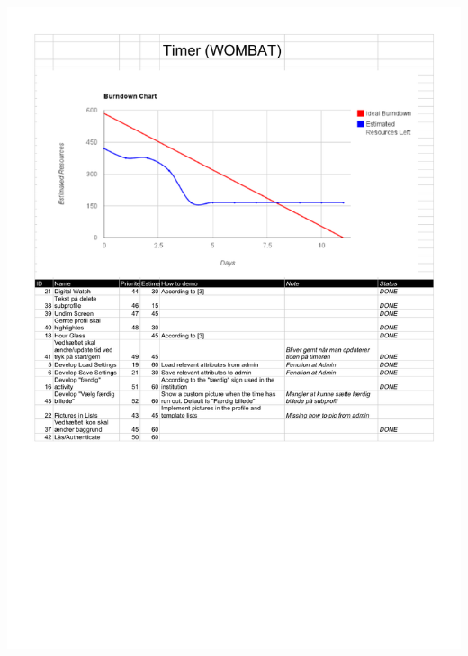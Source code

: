 \begin{center}
		\includegraphics[scale=0.5]{Development/burndown_charts/Sprint_4.pdf}

\end{center}
